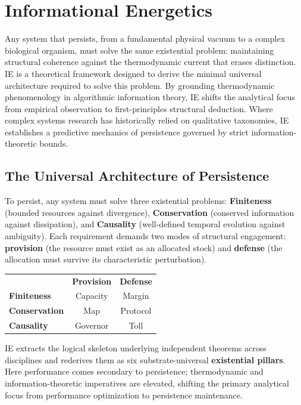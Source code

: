 \section{Informational Energetics}
\label{sec:IE}
Any system that persists, from a fundamental physical vacuum to a complex biological organism, must solve the same existential problem: maintaining structural coherence against the thermodynamic current that erases distinction. IE is a theoretical framework designed to derive the minimal universal architecture required to solve this problem. By grounding thermodynamic phenomenology in algorithmic information theory, IE shifts the analytical focus from empirical observation to first-principles structural deduction. Where complex systems research has historically relied on qualitative taxonomies, IE establishes a predictive mechanics of persistence governed by strict information-theoretic bounds.

\subsection{The Universal Architecture of Persistence}
\label{subsec:universal_architecture_of_persistence}
To persist, any system must solve three existential problems: \textbf{Finiteness} (bounded resources against divergence), \textbf{Conservation} (conserved information against dissipation), and \textbf{Causality} (well-defined temporal evolution against ambiguity). Each requirement demands two modes of structural engagement: \textbf{provision} (the resource must exist as an allocated stock) and \textbf{defense} (the allocation must survive its characteristic perturbation).

\begin{center}
\begin{tabular}{lcc}
 & \textbf{Provision} & \textbf{Defense} \\
\textbf{Finiteness} & Capacity & Margin \\
\textbf{Conservation} & Map & Protocol \\
\textbf{Causality} & Governor & Toll \\
\end{tabular}
\end{center}

IE extracts the logical skeleton underlying independent theorems across disciplines and rederives them as six substrate-universal \textbf{existential pillars}. Here performance comes secondary to persistence; thermodynamic and information-theoretic imperatives are elevated, shifting the primary analytical focus from performance optimization to persistence maintenance.

